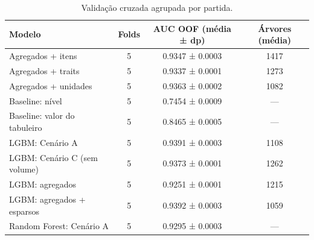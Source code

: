 \begin{table}[htbp]
\caption{Validação cruzada agrupada por partida.}
\label{tab:folds}
\centering
\small
\begin{tabular}{lccc}
\toprule
Modelo & Folds & AUC OOF (média ± dp) & Árvores (média) \\
\midrule
Agregados + itens & 5 & 0.9347 ± 0.0003 & 1417 \\
Agregados + traits & 5 & 0.9337 ± 0.0001 & 1273 \\
Agregados + unidades & 5 & 0.9363 ± 0.0002 & 1082 \\
Baseline: nível & 5 & 0.7454 ± 0.0009 & — \\
Baseline: valor do tabuleiro & 5 & 0.8465 ± 0.0005 & — \\
LGBM: Cenário A & 5 & 0.9391 ± 0.0003 & 1108 \\
LGBM: Cenário C (sem volume) & 5 & 0.9373 ± 0.0001 & 1262 \\
LGBM: agregados & 5 & 0.9251 ± 0.0001 & 1215 \\
LGBM: agregados + esparsos & 5 & 0.9392 ± 0.0003 & 1059 \\
Random Forest: Cenário A & 5 & 0.9295 ± 0.0003 & — \\
\bottomrule
\end{tabular}
\end{table}
